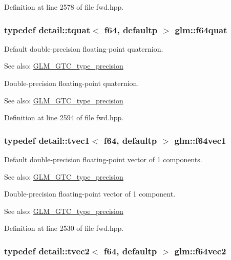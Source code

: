 Definition at line 2578 of file fwd.hpp.\hypertarget{group__gtc__type__precision_g860589eddc4ff95795a858318652b6ff}{
\subsubsection[f64quat]{\setlength{\rightskip}{0pt plus 5cm}typedef detail::tquat$<$ f64, defaultp $>$ {\bf glm::f64quat}}}
\label{group__gtc__type__precision_g860589eddc4ff95795a858318652b6ff}


Default double-precision floating-point quaternion. \begin{Desc}
\item[See also:]\hyperlink{group__gtc__type__precision}{GLM\_\-GTC\_\-type\_\-precision}\end{Desc}
Double-precision floating-point quaternion. \begin{Desc}
\item[See also:]\hyperlink{group__gtc__type__precision}{GLM\_\-GTC\_\-type\_\-precision} \end{Desc}


Definition at line 2594 of file fwd.hpp.\hypertarget{group__gtc__type__precision_g55bdb96a24de2e3531c74310b12ba5d7}{
\subsubsection[f64vec1]{\setlength{\rightskip}{0pt plus 5cm}typedef detail::tvec1$<$ f64, defaultp $>$ {\bf glm::f64vec1}}}
\label{group__gtc__type__precision_g55bdb96a24de2e3531c74310b12ba5d7}


Default double-precision floating-point vector of 1 components. \begin{Desc}
\item[See also:]\hyperlink{group__gtc__type__precision}{GLM\_\-GTC\_\-type\_\-precision}\end{Desc}
Double-precision floating-point vector of 1 component. \begin{Desc}
\item[See also:]\hyperlink{group__gtc__type__precision}{GLM\_\-GTC\_\-type\_\-precision} \end{Desc}


Definition at line 2530 of file fwd.hpp.\hypertarget{group__gtc__type__precision_g3f131d462df8154918f93ba1ac7cc4bd}{
\subsubsection[f64vec2]{\setlength{\rightskip}{0pt plus 5cm}typedef detail::tvec2$<$ f64, defaultp $>$ {\bf glm::f64vec2}}}
\label{group__gtc__type__precision_g3f131d462df8154918f93ba1ac7cc4bd}



